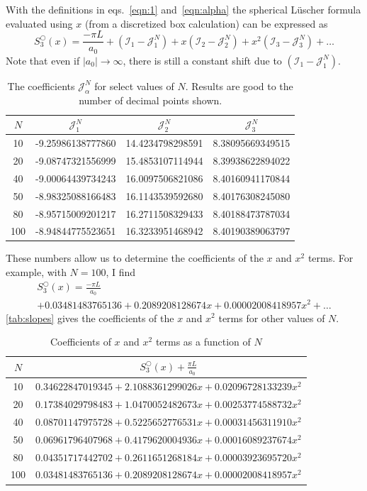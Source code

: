 \documentclass[11pt]{article}
\begin{document}
With the definitions in eqs.~\eqref{eqn:1} and~\eqref{eqn:alpha} the spherical L\"uscher formula evaluated using $x$ (from a discretized box calculation) can be expressed as
\begin{equation}
S^\bigcirc_3(x)=\frac{-\pi L}{a_0}+\left(\mathcal{I}_1-\mathcal{J}_1^N\right)+x\left(\mathcal{I}_2-\mathcal{J}_2^N\right)+x^2\left(\mathcal{I}_3-\mathcal{J}_3^N\right)+\ldots
\end{equation}
Note that even if $|a_0|\to\infty$, there is still a constant shift due to $\left(\mathcal{I}_1-\mathcal{J}_1^N\right)$.   
\begin{table}
\caption{The coefficients $\mathcal{J}_\alpha^N$ for select values of $N$.  Results are good to the number of decimal points shown. \label{tab:J coefficients}}
\center
\begin{tabular}{c||c|c|c}
$N$ & $\mathcal{J}_1^N$ & $\mathcal{J}_2^N$ &$\mathcal{J}_3^N$ \\
\hline
10 & -9.25986138777860 & 14.4234798298591 & 8.38095669349515\\
20 & -9.08747321556999 & 15.4853107114944 & 8.39938622894022\\
40 & -9.00064439734243 & 16.0097506821086 & 8.40160941170844\\
50 & -8.98325088166483 & 16.1143539592680 & 8.40176308245080\\
80 & -8.95715009201217 & 16.2711508329433 & 8.40188473787034\\
100 & -8.94844775523651 & 16.3233951468942 & 8.40190389063797
\end{tabular}
\end{table}
These numbers allow us to determine the coefficients of the $x$ and $x^2$ terms.  For example, with $N=100$, I find
\begin{multline}
S^\bigcirc_3(x)=\frac{-\pi L}{a_0}\\
+0.03481483765136+0.2089208128674 x+0.00002008418957 x^2+\ldots
\end{multline}
\autoref{tab:slopes} gives the coefficients of the $x$ and $x^2$ terms for other values of $N$.
\begin{table}
\caption{Coefficients of $x$ and $x^2$ terms as a function of $N$\label{tab:slopes}}
\center
\begin{tabular}{c|c}
$N$ & $S^\bigcirc_3(x)+\frac{\pi L}{a_0}$ \\
\hline
10 & $0.34622847019345+2.1088361299026 x+0.02096728133239 x^2$\\
20 & $0.17384029798483+1.0470052482673 x+0.00253774588732 x^2$\\
40 & $0.08701147975728+0.5225652776531 x+0.00031456311910 x^2$\\
50 & $0.06961796407968+0.4179620004936 x+0.00016089237674 x^2$\\
80 & $0.04351717442702+0.2611651268184 x+0.00003923695720 x^2$\\
100 &$0.03481483765136+0.2089208128674 x+0.00002008418957 x^2$
\end{tabular}
\end{table}
\end{document}
